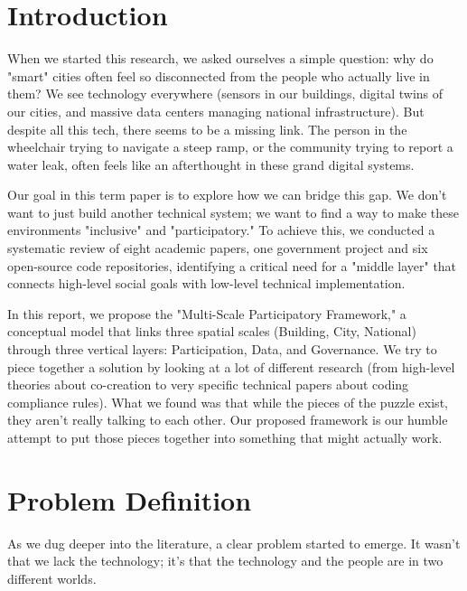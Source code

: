 \documentclass[a4paper,oneside,12pt]{report}
\begin{document}
\chapter{Introduction}

When we started this research, we asked ourselves a simple question: why do "smart" cities often feel so disconnected from the people who actually live in them? We see technology everywhere (sensors in our buildings, digital twins of our cities, and massive data centers managing national infrastructure). But despite all this tech, there seems to be a missing link. The person in the wheelchair trying to navigate a steep ramp, or the community trying to report a water leak, often feels like an afterthought in these grand digital systems.

Our goal in this term paper is to explore how we can bridge this gap. We don't want to just build another technical system; we want to find a way to make these environments "inclusive" and "participatory." To achieve this, we conducted a systematic review of eight academic papers, one government project and six open-source code repositories, identifying a critical need for a "middle layer" that connects high-level social goals with low-level technical implementation.

In this report, we propose the "Multi-Scale Participatory Framework," a conceptual model that links three spatial scales (Building, City, National) through three vertical layers: Participation, Data, and Governance. We try to piece together a solution by looking at a lot of different research (from high-level theories about co-creation to very specific technical papers about coding compliance rules). What we found was that while the pieces of the puzzle exist, they aren't really talking to each other. Our proposed framework is our humble attempt to put those pieces together into something that might actually work.

\chapter{Problem Definition}

As we dug deeper into the literature, a clear problem started to emerge. It wasn't that we lack the technology; it's that the technology and the people are in two different worlds.
\end{document}
